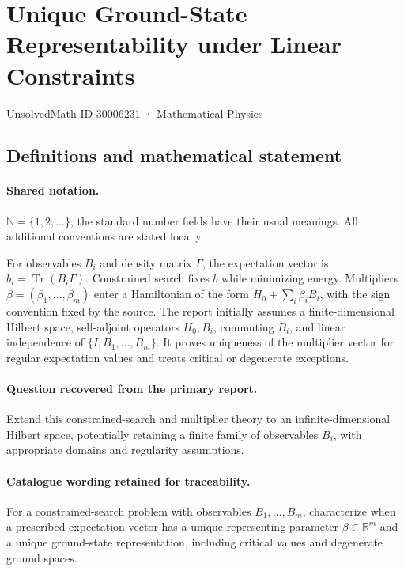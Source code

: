 \documentclass[11pt]{article}
\begin{document}
\setcounter{section}{30006230}
\section{Unique Ground-State Representability under Linear Constraints}\label{30006231}
{\small UnsolvedMath ID 30006231 · Mathematical Physics}
\subsection{Definitions and mathematical statement}

\paragraph{Shared notation.}$\mathbb N=\{1,2,\ldots\}$; the standard number fields have their usual meanings. All additional conventions are stated locally.


For observables $B_i$ and density matrix $\Gamma$, the expectation vector is $b_i=\operatorname{Tr}(B_i\Gamma)$. Constrained search fixes $b$ while minimizing energy. Multipliers $\beta=(\beta_1,\ldots,\beta_m)$ enter a Hamiltonian of the form $H_0+\sum_i\beta_iB_i$, with the sign convention fixed by the source. The report initially assumes a finite-dimensional Hilbert space, self-adjoint operators $H_0,B_i$, commuting $B_i$, and linear independence of $\{I,B_1,\ldots,B_m\}$. It proves uniqueness of the multiplier vector for regular expectation values and treats critical or degenerate exceptions.

\paragraph{Question recovered from the primary report.}Extend this constrained-search and multiplier theory to an infinite-dimensional Hilbert space, potentially retaining a finite family of observables $B_i$, with appropriate domains and regularity assumptions.

\paragraph{Catalogue wording retained for traceability.}
For a constrained-search problem with observables $B_1,\ldots,B_m$, characterize when a prescribed expectation vector has a unique representing parameter $\beta\in\mathbb{R}^m$ and a unique ground-state representation, including critical values and degenerate ground spaces.
\end{document}
